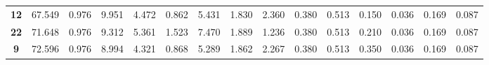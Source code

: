 \documentclass[withoutpreface,bwprint]{cumcmthesis} %
\begin{document}
\begin{table}[!h]
\begin{tabular}{@{}ccccccccccccccc@{}}
	\textbf{12}                                               & 67.549                                                         & 0.976                                                         & 9.951                                                        & 4.472                                                        & 0.862                                                        & 5.431                                                          & 1.830                                                          & 2.360                                                        & 0.380                                                        & 0.513                                                        & 0.150                                                           & 0.036                                                        & 0.169                                                         & 0.087                                                         \\
	\textbf{22}                                               & 71.648                                                         & 0.976                                                         & 9.312                                                        & 5.361                                                        & 1.523                                                        & 7.470                                                          & 1.889                                                          & 1.236                                                        & 0.380                                                        & 0.513                                                        & 0.210                                                           & 0.036                                                        & 0.169                                                         & 0.087                                                         \\
	\textbf{9}                                                & 72.596                                                         & 0.976                                                         & 8.994                                                        & 4.321                                                        & 0.868                                                        & 5.289                                                          & 1.862                                                          & 2.267                                                        & 0.380                                                        & 0.513                                                        & 0.350                                                           & 0.036                                                        & 0.169                                                         & 0.087                                                         \\

\end{tabular}
\end{table}
\end{document}
